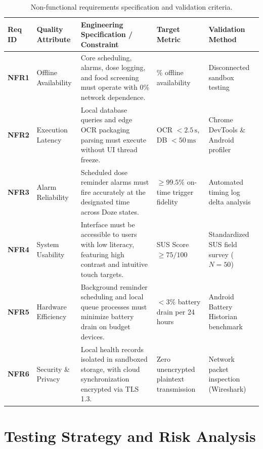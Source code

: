 \begin{table}[!htbp]
  \centering
  \caption{Non-functional requirements specification and validation criteria.}
  \label{tab:non_functional_requirements}
  \scriptsize
  \setlength{\tabcolsep}{3pt}
  \begin{tabularx}{\textwidth}{@{} l >{\raggedright\arraybackslash}p{2.2cm} >{\raggedright\arraybackslash}X >{\raggedright\arraybackslash}p{2.4cm} >{\raggedright\arraybackslash}p{2.2cm} @{}}
    \toprule
    \textbf{Req ID} & \textbf{Quality Attribute} & \textbf{Engineering Specification / Constraint} & \textbf{Target Metric} & \textbf{Validation Method} \\
    \midrule
    \textbf{NFR1} & Offline Availability & Core scheduling, alarms, dose logging, and food screening must operate with 0\% network dependence. & 100\% offline availability & Disconnected sandbox testing \\
    \midrule
    \textbf{NFR2} & Execution Latency & Local database queries and edge OCR packaging parsing must execute without UI thread freeze. & OCR $< 2.5\,\text{s}$, DB $< 50\,\text{ms}$ & Chrome DevTools \& Android profiler \\
    \midrule
    \textbf{NFR3} & Alarm Reliability & Scheduled dose reminder alarms must fire accurately at the designated time across Doze states. & $\ge 99.5\%$ on-time trigger fidelity & Automated timing log delta analysis \\
    \midrule
    \textbf{NFR4} & System Usability & Interface must be accessible to users with low literacy, featuring high contrast and intuitive touch targets. & SUS Score $\ge 75/100$ & Standardized SUS field survey ($N=50$) \\
    \midrule
    \textbf{NFR5} & Hardware Efficiency & Background reminder scheduling and local queue processes must minimize battery drain on budget devices. & $< 3\%$ battery drain per 24 hours & Android Battery Historian benchmark \\
    \midrule
    \textbf{NFR6} & Security \& Privacy & Local health records isolated in sandboxed storage, with cloud synchronization encrypted via TLS 1.3. & Zero unencrypted plaintext transmission & Network packet inspection (Wireshark) \\
    \bottomrule
  \end{tabularx}
\end{table}

\section{Testing Strategy and Risk Analysis}

